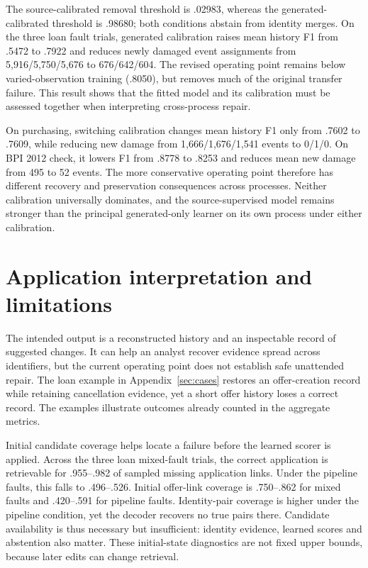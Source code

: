 \documentclass[11pt]{article}
\begin{document}
The source-calibrated removal threshold is .02983, whereas the generated-calibrated threshold is .98680; both conditions abstain from identity merges. On the three loan fault trials, generated calibration raises mean history F1 from .5472 to .7922 and reduces newly damaged event assignments from 5,916/5,750/5,676 to 676/642/604. The revised operating point remains below varied-observation training (.8050), but removes much of the original transfer failure. This result shows that the fitted model and its calibration must be assessed together when interpreting cross-process repair.

On purchasing, switching calibration changes mean history F1 only from .7602 to .7609, while reducing new damage from 1,666/1,676/1,541 events to 0/1/0. On BPI 2012 check, it lowers F1 from .8778 to .8253 and reduces mean new damage from 495 to 52 events. The more conservative operating point therefore has different recovery and preservation consequences across processes. Neither calibration universally dominates, and the source-supervised model remains stronger than the principal generated-only learner on its own process under either calibration.


\section{Application interpretation and limitations}
The intended output is a reconstructed history and an inspectable record of suggested changes. It can help an analyst recover evidence spread across identifiers, but the current operating point does not establish safe unattended repair. The loan example in Appendix~\ref{sec:cases} restores an offer-creation record while retaining cancellation evidence, yet a short offer history loses a correct record. The examples illustrate outcomes already counted in the aggregate metrics.

Initial candidate coverage helps locate a failure before the learned scorer is applied. Across the three loan mixed-fault trials, the correct application is retrievable for .955--.982 of sampled missing application links. Under the pipeline faults, this falls to .496--.526. Initial offer-link coverage is .750--.862 for mixed faults and .420--.591 for pipeline faults. Identity-pair coverage is higher under the pipeline condition, yet the decoder recovers no true pairs there. Candidate availability is thus necessary but insufficient: identity evidence, learned scores and abstention also matter. These initial-state diagnostics are not fixed upper bounds, because later edits can change retrieval.
\end{document}
